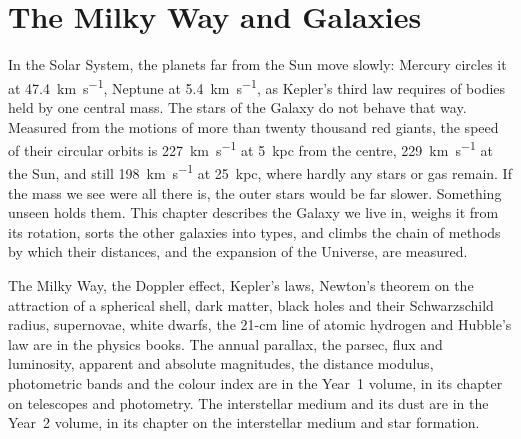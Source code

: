 \chapter{The Milky Way and Galaxies}\label{ch:b3:milky-way-galaxies}

In the Solar System, the planets far from the Sun move slowly: Mercury
circles it at \qty{47.4}{km.s^{-1}}, Neptune at \qty{5.4}{km.s^{-1}}, as
Kepler's third law requires of bodies held by one central mass. The stars
of the Galaxy do not behave that way. Measured from the motions of more
than twenty thousand red giants, the speed of their circular orbits is
\qty{227}{km.s^{-1}} at \qty{5}{kpc} from the centre, \qty{229}{km.s^{-1}}
at the Sun, and still \qty{198}{km.s^{-1}} at \qty{25}{kpc}, where hardly
any stars or gas remain. If the mass we see were all there is, the outer
stars would be far slower. Something unseen holds them. This chapter
describes the Galaxy we live in, weighs it from its rotation, sorts the
other galaxies into types, and climbs the chain of methods by which their
distances, and the expansion of the Universe, are measured.

\begin{recall}
The Milky Way, the Doppler effect, Kepler's laws, Newton's theorem on the
attraction of a spherical shell, dark matter, black holes and their
Schwarzschild radius, supernovae, white dwarfs, the 21-cm line of atomic
hydrogen and Hubble's law are in the physics books. The annual parallax,
the parsec, flux and luminosity, apparent and absolute magnitudes, the
distance modulus, photometric bands and the colour index are in the
Year~1 volume, in its chapter on telescopes and photometry. The
interstellar medium and its dust are in the Year~2 volume, in its chapter
on the interstellar medium and star formation.
\end{recall}

